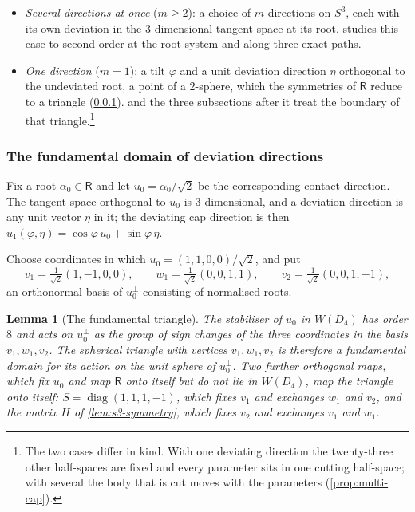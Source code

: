 \documentclass[11pt,reqno]{amsart}
\renewcommand{\_}{\origunderscore\allowbreak}
\numberwithin{equation}{section}
\theoremstyle{plain}
\newtheorem{lem}[thm]{Lemma}
\theoremstyle{definition}
\theoremstyle{remark}
\newcommand{\Rt}{\mathsf{R}}                 %
\newcommand{\tilt}{\varphi}                  %
\newcommand{\dev}{\eta}                      %
\DeclareMathOperator{\diag}{diag}
\begin{document}
\begin{itemize}[leftmargin=1.6em]
\item \emph{Several directions at once} ($m\ge2$): a choice of $m$
directions on $S^3$, each with its own deviation in the
$3$-dimensional tangent space at its root. 
studies this case to second order at the root
system and along three exact paths.
\item \emph{One direction} ($m=1$): a tilt $\tilt$ and a unit deviation
direction $\dev$ orthogonal to the undeviated root, a point of a
$2$-sphere, which the symmetries of $\Rt$ reduce to a triangle
(\cref{sec:fundamental-domain-new}).  and the
three subsections after it treat the boundary of that
triangle.\footnote{The two cases differ in kind. With one deviating
direction the twenty-three other half-spaces are fixed and every
parameter sits in one cutting half-space; with several the body that is
cut moves with the parameters (\cref{prop:multi-cap}).}
\end{itemize}

\subsubsection{The fundamental domain of deviation directions}\label{sec:fundamental-domain-new}

Fix a root $\alpha_0\in\Rt$ and let $u_0=\alpha_0/\sqrt2$ be the
corresponding contact direction. The tangent space orthogonal to $u_0$
is $3$-dimensional, and a deviation direction is any unit vector
$\dev$ in it; the deviating cap direction is then
$u_1(\tilt,\dev)=\cos\tilt\,u_0+\sin\tilt\,\dev$.

Choose coordinates in which $u_0=(1,1,0,0)/\sqrt2$, and put
\[
  v_1=\tfrac1{\sqrt2}(1,-1,0,0),\qquad
  w_1=\tfrac1{\sqrt2}(0,0,1,1),\qquad
  v_2=\tfrac1{\sqrt2}(0,0,1,-1),
\]
an orthonormal basis of $u_0^\perp$ consisting of normalised roots.

\begin{lem}[The fundamental triangle]\label{lem:two-symmetries-new}
The stabiliser of $u_0$ in $W(D_4)$ has order $8$ and acts on $u_0^\perp$
as the group of sign changes of the three coordinates in the basis
$v_1,w_1,v_2$. The spherical triangle with vertices $v_1,w_1,v_2$ is
therefore a fundamental domain for its action on the unit sphere of
$u_0^\perp$. Two further orthogonal maps, which fix $u_0$ and map $\Rt$
onto itself but do not lie in $W(D_4)$, map the triangle onto itself:
$S=\diag(1,1,1,-1)$, which fixes $v_1$ and exchanges $w_1$ and $v_2$, and
the matrix $H$ of \cref{lem:s3-symmetry}, which fixes $v_2$ and exchanges
$v_1$ and $w_1$.
\end{lem}
\end{document}
